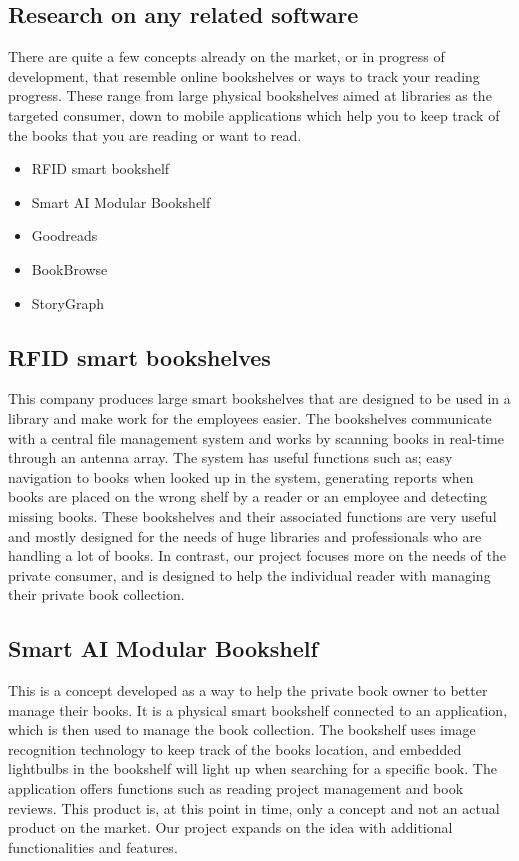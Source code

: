 \documentclass[conference]{IEEEtran}
\begin{document}
\subsection*{Research on any related software}
There are quite a few concepts already on the market, or in progress of development, that resemble online bookshelves or ways to track your reading progress. These range from large physical bookshelves aimed at libraries as the targeted consumer, down to mobile applications which help you to keep track of the books that you are reading or want to read.
\begin{itemize}
	\item RFID smart bookshelf
	\item Smart AI Modular Bookshelf
	\item Goodreads
	\item BookBrowse
	\item StoryGraph
\end{itemize}


\subsection{RFID smart bookshelves} 
This company produces large smart bookshelves that are designed to be used in a library and make work for the employees easier. The bookshelves communicate with a central file management system and works by scanning books in real-time through an antenna array. The system has useful functions such as; easy navigation to books when looked up in the system, generating reports when books are placed on the wrong shelf by a reader or an employee and detecting missing books. These bookshelves and their associated functions are very useful and mostly designed for the needs of huge libraries and professionals who are handling a lot of books. In contrast, our project focuses more on the needs of the private consumer, and is designed to help the individual reader with managing their private book collection.\cite{RFID} \\

\subsection{Smart AI Modular Bookshelf} 
This is a concept developed as a way to help the private book owner to better manage their books. It is a physical smart bookshelf connected to an application, which is then used to manage the book collection. The bookshelf uses image recognition technology to keep track of the books location, and embedded lightbulbs in the bookshelf will light up when searching for a specific book. The application offers functions such as reading project management and book reviews. This product is, at this point in time, only a concept and not an actual product on the market. Our project expands on the idea with additional functionalities and features.\cite{Smartbookshelf}\\
\end{document}
